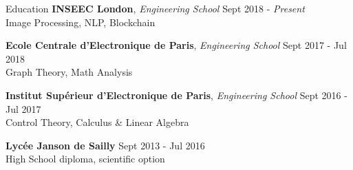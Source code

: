 \documentclass{resume} %
\begin{document}
	
	\begin{rSection}{Education}
		{\bf INSEEC London}, {\em Engineering School} \hfill {Sept 2018 - \em Present}
		\\ Image Processing, NLP, Blockchain
		
		{\bf Ecole Centrale d'Electronique de Paris}, {\em Engineering School} \hfill {Sept 2017 - Jul 2018}
		\\ Graph Theory, Math Analysis
		
		{\bf Institut Supérieur d'Electronique de Paris}, {\em Engineering School} \hfill {Sept 2016 - Jul 2017}
		\\ Control Theory, Calculus \& Linear Algebra
		
		{\bf Lycée Janson de Sailly} \hfill {Sept 2013 - Jul 2016}
		\\ High School diploma, scientific option
	\end{rSection}
	
	
	
	
\end{document}
